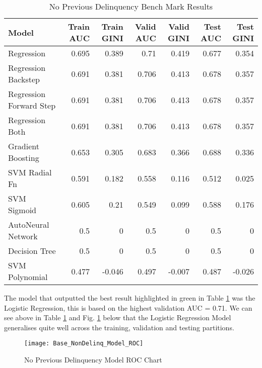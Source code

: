 \begin{table}[H]
	\centering
	\resizebox{\textwidth}{!}
	{
		\begin{tabular}{l | r | r| r |r| r|r}
			\hline
			\textbf{Model} & \textbf{Train AUC} & \textbf{Train GINI} & \textbf{Valid AUC} & \textbf{Valid GINI}& \textbf{Test AUC} & \textbf{Test GINI}\\
			\hline
			\cellcolor{green!25}Regression & \cellcolor{green!25}0.695 & \cellcolor{green!25}0.389 & \cellcolor{green!25}0.71 & \cellcolor{green!25}0.419 & \cellcolor{green!25}0.677 & \cellcolor{green!25}0.354 \\
			Regression Backstep & 0.691 & 0.381 & 0.706 & 0.413 & 0.678 & 0.357 \\
			Regression Forward Step & 0.691 & 0.381 & 0.706 & 0.413 & 0.678 & 0.357 \\
			Regression Both & 0.691 & 0.381 & 0.706 & 0.413 & 0.678 & 0.357 \\
			Gradient Boosting & 0.653 & 0.305 & 0.683 & 0.366 & 0.688 & 0.336 \\
			SVM Radial Fn & 0.591 & 0.182 & 0.558 & 0.116 & 0.512 & 0.025 \\
			SVM Sigmoid & 0.605 & 0.21 & 0.549 & 0.099 & 0.588 & 0.176 \\
			AutoNeural Network & 0.5 & 0 & 0.5 & 0 & 0.5 & 0 \\
			Decision Tree & 0.5 & 0 & 0.5 & 0 & 0.5 & 0 \\
			SVM Polynomial & 0.477 & -0.046 & 0.497 & -0.007 & 0.487 & -0.026 \\
			\hline
		\end{tabular}
	}
	\caption{No Previous Delinquency Bench Mark Results}
	\label{table:NoPreviousDelinquencyBaseModelDetails}
\end{table}

The model that outputted the best result highlighted in green in Table \ref{table:NoPreviousDelinquencyBaseModelDetails} was the Logistic Regression, this is based on the highest validation AUC = 0.71. We can see above in Table \ref{table:NoPreviousDelinquencyBaseModelDetails} and Fig. \ref{fig:NonDelinq_Model_ROC} below that the Logistic Regression Model generalises quite well across the training, validation and testing partitions.

\begin{figure}[H]
	\texttt{[image: Base\_NonDelinq\_Model\_ROC]}
	\caption{No Previous Delinquency Model ROC Chart}
	\label{fig:NonDelinq_Model_ROC}
\end{figure}


